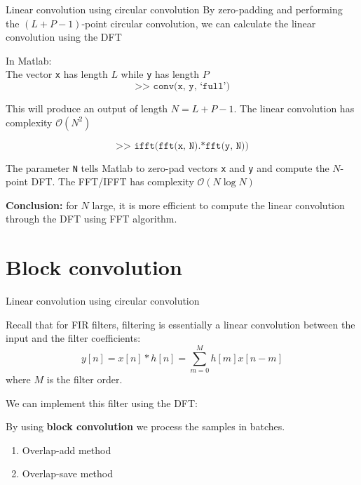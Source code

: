 \documentclass[10pt, aspectratio=169]{beamer}
\begin{document}
\begin{frame}{Linear convolution using circular convolution}
By zero-padding and performing the $(L+P-1)$-point circular convolution, we can calculate the linear convolution using the DFT

\vspace{0.25cm}
In Matlab:\\
The vector \texttt{x} has length $L$ while \texttt{y} has length $P$
\begin{equation*}
	\texttt{>> conv(x, y, `full')} \tag{linear convolution}
\end{equation*}

This will produce an output of length $N = L+P-1$. The linear convolution has complexity $\mathcal{O}(N^2)$

\begin{equation*}
\texttt{>> ifft(fft(x, N).*fft(y, N))} \tag{circular convolution}
\end{equation*}

The parameter \texttt{N} tells Matlab to zero-pad vectors \texttt{x} and \texttt{y}  and compute the $N$-point DFT. The FFT/IFFT has complexity $\mathcal{O}(N\log N)$

\vspace{0.25cm}
\textbf{Conclusion:} for $N$ large, it is more efficient to compute the linear convolution through the DFT using FFT algorithm.
\end{frame}

\section{Block convolution}
\begin{frame}{Linear convolution using circular convolution}

	Recall that for FIR filters, filtering is essentially a linear convolution between the input and the filter coefficients:
	\begin{equation*}
		y[n] = x[n] \ast h[n] = \sum_{m =0}^{M} h[m]x[n-m]
	\end{equation*}
	where $M$ is the filter order.
	
	\vspace{0.25cm}
	We can implement this filter using the DFT:
	\begin{center}
		\resizebox{0.7\textwidth}{!}{}
	\end{center}

	By using \textbf{block convolution} we process the samples in batches.
	\begin{enumerate}
		\item Overlap-add method
		\item Overlap-save method
	\end{enumerate}
\end{frame}
\end{document}
